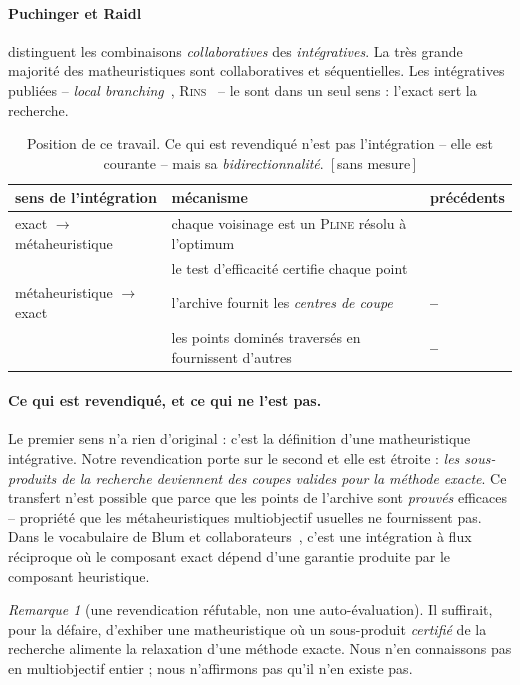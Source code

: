 \documentclass[11pt,a4paper]{article}
\theoremstyle{plain}
\theoremstyle{remark}
\newtheorem{remark}{Remarque}
\newcommand{\ILP}{\textsc{Pline}}
\newcommand{\confna}{\textsf{\footnotesize[\,sans mesure\,]}}
\begin{document}
\paragraph{Puchinger et Raidl~\cite{puchinger2005}} distinguent les
combinaisons \emph{collaboratives} des \emph{intégratives}. La très grande
majorité des matheuristiques sont collaboratives et séquentielles. Les
intégratives publiées -- \emph{local branching}~\cite{fischetti2003},
\textsc{Rins}~\cite{danna2005} -- le sont dans un seul sens : l'exact sert
la recherche.

\begin{table}[H]
\centering
\caption{Position de ce travail. Ce qui est revendiqué n'est pas
l'intégration -- elle est courante -- mais sa
\emph{bidirectionnalité}.\ \confna}
\label{tab:taxo}
\begin{tabular}{lll}
\toprule
sens de l'intégration & mécanisme & précédents\\
\midrule
exact $\to$ métaheuristique
 & chaque voisinage est un \ILP{} résolu à l'optimum
 & \cite{fischetti2003,danna2005}\\
 & le test d'efficacité certifie chaque point & \cite{chergui2008}\\
\midrule
métaheuristique $\to$ exact
 & l'archive fournit les \emph{centres de coupe} & \textbf{--}\\
 & les points dominés traversés en fournissent d'autres & \textbf{--}\\
\bottomrule
\end{tabular}
\end{table}

\paragraph{Ce qui est revendiqué, et ce qui ne l'est pas.} Le premier sens
n'a rien d'original : c'est la définition d'une matheuristique intégrative.
Notre revendication porte sur le second et elle est étroite : \emph{les
sous-produits de la recherche deviennent des coupes valides pour la méthode
exacte}. Ce transfert n'est possible que parce que les points de l'archive
sont \emph{prouvés} efficaces -- propriété que les métaheuristiques
multiobjectif usuelles ne fournissent pas. Dans le vocabulaire de Blum et
collaborateurs~\cite{blum2011}, c'est une intégration à flux réciproque où
le composant exact dépend d'une garantie produite par le composant
heuristique.

\begin{remark}[une revendication réfutable, non une auto-évaluation]
Il suffirait, pour la défaire, d'exhiber une matheuristique où un
sous-produit \emph{certifié} de la recherche alimente la relaxation d'une
méthode exacte. Nous n'en connaissons pas en multiobjectif entier ; nous
n'affirmons pas qu'il n'en existe pas.
\end{remark}
\end{document}
